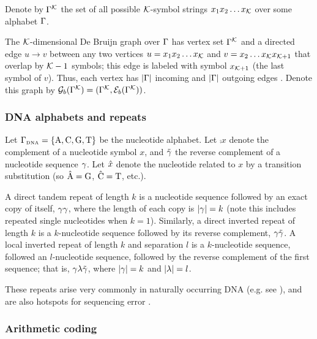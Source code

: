\documentclass[english]{article}
\begin{document}
Denote by $\Gamma^{\cal K}$
the set of all possible ${\cal K}$-symbol strings
$x_1 x_2 \ldots x_{\cal K}$ over some alphabet $\Gamma$.

The ${\cal K}$-dimensional De Bruijn graph over $\Gamma$
has vertex set $\Gamma^{\cal K}$
and a directed edge $u \to v$ between any two vertices
$u=x_1 x_2 \ldots x_{\cal K}$ and $v=x_2 \ldots x_{\cal K} x_{{\cal K}+1}$
that overlap by ${\cal K}-1$ symbols; this edge is labeled with symbol $x_{{\cal K}+1}$ (the last symbol of $v$).
Thus, each vertex has $|\Gamma|$ incoming and $|\Gamma|$ outgoing edges \cite{DeBruijn1946,PevznerEtAl2001}.
Denote this graph by ${\cal G}_b(\Gamma^{\cal K}) = (\Gamma^{\cal K},{\cal E}_b(\Gamma^{\cal K}))$.

\subsubsection{DNA alphabets and repeats}

Let $\Gamma_{\mbox{\tiny DNA}} = \{ \mbox{A}, \mbox{C}, \mbox{G}, \mbox{T} \} $ be the nucleotide alphabet.
Let $\comp{x}$ denote the complement of a nucleotide symbol $x$,
and $\tilde{\gamma}$ the reverse complement of a nucleotide sequence $\gamma$.
Let $\hat{x}$ denote the nucleotide related to $x$ by a transition substitution
(so $\hat{\mbox{A}} = \mbox{G}$, $\hat{\mbox{C}}=\mbox{T}$, etc.).

A direct tandem repeat of length $k$ is a nucleotide sequence followed by an exact copy of itself, $\gamma \gamma$, where the length of each copy is $|\gamma|=k$
(note this includes repeated single nucleotides when $k=1$).
Similarly, a direct inverted repeat of length $k$ is a $k$-nucleotide sequence followed by its reverse complement, $\gamma \tilde{\gamma}$.
A local inverted repeat of length $k$ and separation $l$ is a $k$-nucleotide sequence, followed an $l$-nucleotide sequence, followed by the reverse complement
of the first sequence; that is, $\gamma \lambda \tilde{\gamma}$, where $|\gamma|=k$ and $|\lambda|=l$.

These repeats arise very commonly in naturally occurring DNA (e.g. see \cite{Ellegren2004}),
and are also hotspots for sequencing error \cite{LaehnemannEtAl2016}.

\subsubsection{Arithmetic coding}
\end{document}
